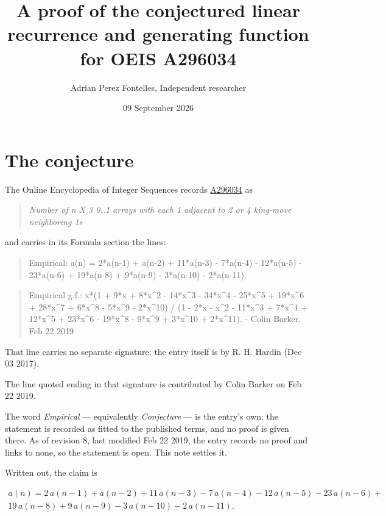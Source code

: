 \documentclass[11pt]{article}
\title{A proof of the conjectured linear recurrence and generating function for OEIS A296034}
\author{Adrian Perez Fontelles, Independent researcher}
\date{09 September 2026}
\theoremstyle{definition}
\begin{document}
\maketitle
\section{The conjecture}

The Online Encyclopedia of Integer Sequences records \href{https://oeis.org/A296034}{A296034} as

\begin{quote}\itshape Number of n X 3 0..1 arrays with each 1 adjacent to 2 or 4 king-move neighboring 1s\end{quote}

and carries in its Formula section the lines:

\begin{quote}\ttfamily Empirical: a(n) = 2*a(n-1) + a(n-2) + 11*a(n-3) - 7*a(n-4) - 12*a(n-5) - 23*a(n-6) + 19*a(n-8) + 9*a(n-9) - 3*a(n-10) - 2*a(n-11).\end{quote}

\begin{quote}\ttfamily Empirical g.f.: x*(1 + 9*x + 8*x\textasciicircum{}2 - 14*x\textasciicircum{}3 - 34*x\textasciicircum{}4 - 25*x\textasciicircum{}5 + 19*x\textasciicircum{}6 + 28*x\textasciicircum{}7 + 6*x\textasciicircum{}8 - 5*x\textasciicircum{}9 - 2*x\textasciicircum{}10) / (1 - 2*x - x\textasciicircum{}2 - 11*x\textasciicircum{}3 + 7*x\textasciicircum{}4 + 12*x\textasciicircum{}5 + 23*x\textasciicircum{}6 - 19*x\textasciicircum{}8 - 9*x\textasciicircum{}9 + 3*x\textasciicircum{}10 + 2*x\textasciicircum{}11). - Colin Barker, Feb 22 2019\end{quote}

That line carries no separate signature; the entry itself is by R. H. Hardin (Dec 03 2017).

The line quoted ending in that signature is contributed by Colin Barker on Feb 22 2019.

The word {\itshape Empirical} --- equivalently {\itshape Conjecture} --- is the entry's own: the statement is recorded as fitted to the published terms, and no proof is given there. As of revision 8, last modified Feb 22 2019, the entry records no proof and links to none, so the statement is open. This note settles it.

Written out, the claim is

\begin{multline*} a(n) = 2\,a(n-1) + a(n-2) + 11\,a(n-3) - 7\,a(n-4) - 12\,a(n-5) - 23\,a(n-6) + \\ 19\,a(n-8) + 9\,a(n-9) - 3\,a(n-10) - 2\,a(n-11). \end{multline*}
\end{document}
